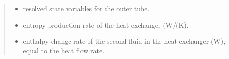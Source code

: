 \documentclass[letterpaper,10pt,english]{sphinxmanual}
\begin{document}
\begin{fulllineitems}
\begin{fulllineitems}
\begin{quote}
\begin{description}
\begin{itemize}
\item {} 
\sphinxAtStartPar
{} \textendash{} resolved state variables for the outer tube.

\item {} 
\sphinxAtStartPar
{} \textendash{} entropy production rate of the heat exchanger (W/(K).

\item {} 
\sphinxAtStartPar
{} \textendash{} enthalpy change rate of the second fluid in the heat
exchanger (W), equal to the heat flow rate.

\end{itemize}


\end{description}\end{quote}

\end{fulllineitems}


\end{fulllineitems}

\end{document}
